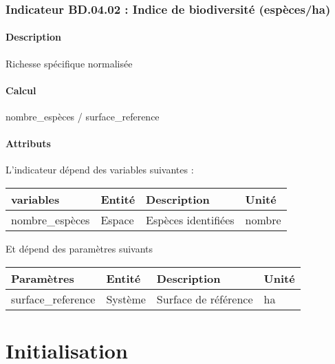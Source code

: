 \documentclass[
]{article}
\newenvironment{Shaded}{\begin{snugshade}}{\end{snugshade}}
\newcommand{\NormalTok}[1]{#1}
\begin{document}
\subsubsection{Indicateur BD.04.02 : Indice de biodiversité
(espèces/ha)}\label{indicateur-bd.04.02-indice-de-biodiversituxe9-espuxe8cesha}

\paragraph{Description}\label{description-24}

Richesse spécifique normalisée

\paragraph{Calcul}\label{calcul-24}

\begin{Shaded}
\begin{Highlighting}[]
\NormalTok{nombre\_espèces / surface\_reference}
\end{Highlighting}
\end{Shaded}

\paragraph{Attributs}\label{attributs-42}

L'indicateur dépend des variables suivantes :

\begin{longtable}[]{@{}llll@{}}
\toprule\noalign{}
\textbf{variables} & \textbf{Entité} & \textbf{Description} &
\textbf{Unité} \\
\midrule\noalign{}
\endhead
\bottomrule\noalign{}
\endlastfoot
nombre\_espèces & Espace & Espèces identifiées & nombre \\
\end{longtable}

Et dépend des paramètres suivants

\begin{longtable}[]{@{}llll@{}}
\toprule\noalign{}
\textbf{Paramètres} & \textbf{Entité} & \textbf{Description} &
\textbf{Unité} \\
\midrule\noalign{}
\endhead
\bottomrule\noalign{}
\endlastfoot
surface\_reference & Système & Surface de référence & ha \\
\end{longtable}

\section{Initialisation}\label{initialisation}
\end{document}
